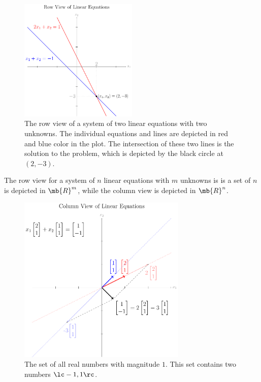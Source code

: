 \begin{figure}[h]
    \centering
    \includegraphics[width=0.5\textwidth]{figure/chapter03/lineqrowview.pdf}
    \caption{The row view of a system of two linear equations with two unknowns. The individual equations and lines are depicted in red and blue color in the plot. The intersection of these two lines is the solution to the problem, which is depicted by the black circle at $(2, -3)$.}
    \label{fig:ch03-lineq-row-view}
\end{figure}
The row view for a system of $n$ linear equations with $m$ unknowns is is a set of $n$ is depicted in $\mb{R}^m$, while the column view is depicted in $\mb{R}^n$.
\begin{figure}[h]
    \centering
    \includegraphics[width=0.714\textwidth]{figure/chapter03/lineqcolview.pdf}
    \caption{The set of all real numbers with magnitude $1$. This set contains two numbers $\lc -1, 1 \rc$.}
    \label{fig:ch03-lineq-col-view}
\end{figure}


